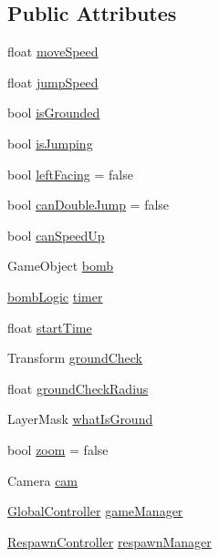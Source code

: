 \subsection*{Public Attributes}
\begin{DoxyCompactItemize}
\item 
float \hyperlink{class_player_movement_a93207dc2742fe0f0b651a54d610b14aa}{move\+Speed}
\item 
float \hyperlink{class_player_movement_a0b04326b12b370063895e93d1a20655d}{jump\+Speed}
\item 
bool \hyperlink{class_player_movement_a27276d8e80bcd5acbb70354b06d66841}{is\+Grounded}
\item 
bool \hyperlink{class_player_movement_a1a59782fc52356398194e29255f1a0ae}{is\+Jumping}
\item 
bool \hyperlink{class_player_movement_a9be62b9ccfa0da0b71b5247df817fe4b}{left\+Facing} = false
\item 
bool \hyperlink{class_player_movement_a93c85b6422113049146e1d40b215a8e2}{can\+Double\+Jump} = false
\item 
bool \hyperlink{class_player_movement_acddd245968579989670e4c0953ae2746}{can\+Speed\+Up}
\item 
Game\+Object \hyperlink{class_player_movement_a97e6c77c213a7631791776290199d532}{bomb}
\item 
\hyperlink{classbomb_logic}{bomb\+Logic} \hyperlink{class_player_movement_a5ea646039fd085e5c19acef918f24a21}{timer}
\item 
float \hyperlink{class_player_movement_ae6959aebc17336198f7eb270f21e2195}{start\+Time}
\item 
Transform \hyperlink{class_player_movement_a4c733d8e1fcc9ffd7223ac3182b380f5}{ground\+Check}
\item 
float \hyperlink{class_player_movement_a14516da52e9f1e37eea97c98afed9ff3}{ground\+Check\+Radius}
\item 
Layer\+Mask \hyperlink{class_player_movement_a04b4dc5a83828e9fefcfe8acbf5de276}{what\+Is\+Ground}
\item 
bool \hyperlink{class_player_movement_ae0fb74ddab994fb7627c7561629a8982}{zoom} = false
\item 
Camera \hyperlink{class_player_movement_a345feead60bc04aeb3bf54f198823097}{cam}
\item 
\hyperlink{class_global_controller}{Global\+Controller} \hyperlink{class_player_movement_adb2c84510e5bf27967dcff5bdfdf80d4}{game\+Manager}
\item 
\hyperlink{class_respawn_controller}{Respawn\+Controller} \hyperlink{class_player_movement_a9669ec66c625ff5409f8fb6be21fef12}{respawn\+Manager}
\end{DoxyCompactItemize}


